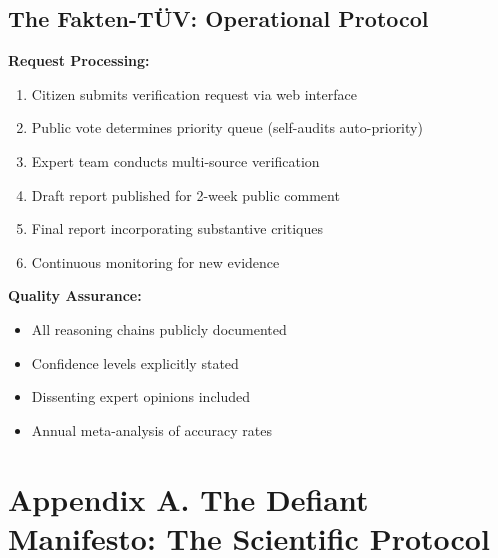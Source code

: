 \documentclass[11pt,a4paper]{article}
\begin{document}
\begin{small}
\subsection*{The Fakten-TÜV: Operational Protocol}

\textbf{Request Processing:}
\begin{enumerate}[nosep]
    \item Citizen submits verification request via web interface
    \item Public vote determines priority queue (self-audits auto-priority)
    \item Expert team conducts multi-source verification
    \item Draft report published for 2-week public comment
    \item Final report incorporating substantive critiques
    \item Continuous monitoring for new evidence
\end{enumerate}

\textbf{Quality Assurance:}
\begin{itemize}[nosep]
    \item All reasoning chains publicly documented
    \item Confidence levels explicitly stated
    \item Dissenting expert opinions included
    \item Annual meta-analysis of accuracy rates
\end{itemize}



\clearpage %



\section*{Appendix A. The Defiant Manifesto: The Scientific Protocol}
\label{app:manifesto}

\vspace{1em}

\noindent{}


\end{small}
\end{document}
